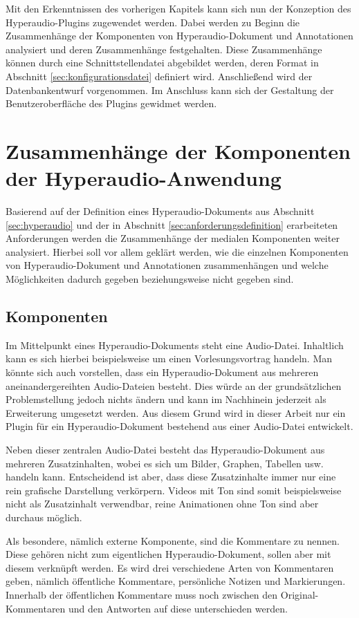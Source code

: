Mit den Erkenntnissen des vorherigen Kapitels kann sich nun der Konzeption des Hyperaudio-Plugins zugewendet werden. Dabei werden zu Beginn die Zusammenhänge der Komponenten von Hyperaudio-Dokument und Annotationen analysiert und deren Zusammenhänge festgehalten. Diese Zusammenhänge können durch eine Schnittstellendatei abgebildet werden, deren Format in Abschnitt \ref{sec:konfigurationsdatei} definiert wird. Anschließend wird der Datenbankentwurf vorgenommen. Im Anschluss kann sich der Gestaltung der Benutzeroberfläche des Plugins gewidmet werden.


\section{Zusammenhänge der Komponenten der Hyperaudio-Anwendung}
Basierend auf der Definition eines Hyperaudio-Dokuments aus Abschnitt \ref{sec:hyperaudio} und der in Abschnitt \ref{sec:anforderungsdefinition} erarbeiteten Anforderungen werden die Zusammenhänge der medialen Komponenten weiter analysiert. Hierbei soll vor allem geklärt werden, wie die einzelnen Komponenten von Hyperaudio-Dokument und Annotationen zusammenhängen und welche Möglichkeiten dadurch gegeben beziehungsweise nicht gegeben sind.


\subsection{Komponenten}
Im Mittelpunkt eines Hyperaudio-Dokuments steht eine Audio-Datei. Inhaltlich kann es sich hierbei beispielsweise um einen Vorlesungsvortrag handeln. Man könnte sich auch vorstellen, dass ein Hyperaudio-Dokument aus mehreren aneinandergereihten Audio-Dateien besteht. Dies würde an der grundsätzlichen Problemstellung jedoch nichts ändern und kann im Nachhinein jederzeit als Erweiterung umgesetzt werden. Aus diesem Grund wird in dieser Arbeit nur ein Plugin für ein Hyperaudio-Dokument bestehend aus einer Audio-Datei entwickelt.

Neben dieser zentralen Audio-Datei besteht das Hyperaudio-Dokument aus mehreren Zusatzinhalten, wobei es sich um Bilder, Graphen, Tabellen usw. handeln kann. Entscheidend ist aber, dass diese Zusatzinhalte immer nur eine rein grafische Darstellung verkörpern. Videos mit Ton sind somit beispielsweise nicht als Zusatzinhalt verwendbar, reine Animationen ohne Ton sind aber durchaus möglich.

Als besondere, nämlich externe Komponente, sind die Kommentare zu nennen. Diese gehören nicht zum eigentlichen Hyperaudio-Dokument, sollen aber mit diesem verknüpft werden. Es wird drei verschiedene Arten von Kommentaren geben, nämlich  öffentliche Kommentare, persönliche Notizen und Markierungen. Innerhalb der öffentlichen Kommentare muss noch zwischen den Original-Kommentaren und den Antworten auf diese unterschieden werden. 


